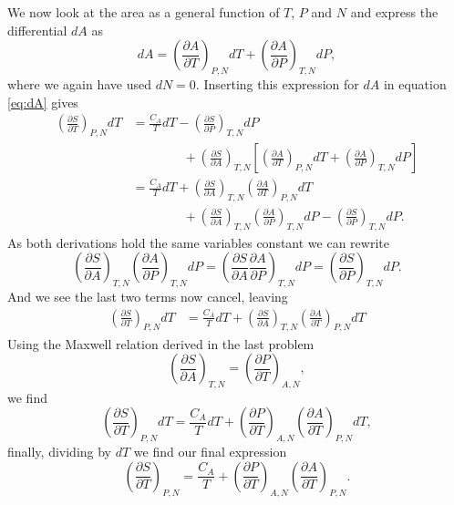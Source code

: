 \documentclass[a4paper, 11pt, titlepage, english]{article}
\begin{document}
We now look at the area as a general function of $T$, $P$ and $N$ and express the differential $dA$ as
$$dA = \left(\frac{\partial A}{\partial T}\right)_{P,N} dT + \left(\frac{\partial A}{\partial P}\right)_{T,N} dP,$$
where we again have used $dN = 0$. Inserting this expression for $dA$ in equation \ref{eq:dA} gives
\begin{align*}
\left( \frac{\partial S}{\partial T}\right)_{P,N}dT &= \frac{C_A}{T}dT -  \left(\frac{\partial S}{\partial P}\right)_{T, N} dP \\ &\qquad\qquad +  \left(\frac{\partial S}{\partial A}\right)_{T, N}\left[\left(\frac{\partial A}{\partial T}\right)_{P,N}dT + \left(\frac{\partial A}{\partial P}\right)_{T,N}dP\right]   \\[0.4cm]
&= \frac{C_A}{T}dT + \left(\frac{\partial S}{\partial A}\right)_{T, N}\left(\frac{\partial A}{\partial T}\right)_{P,N} dT \\ &\qquad\qquad + \left(\frac{\partial S}{\partial A}\right)_{T, N}\left(\frac{\partial A}{\partial P}\right)_{T,N}dP - \left(\frac{\partial S}{\partial P}\right)_{T, N} dP.
\end{align*}
As both derivations hold the same variables constant we can rewrite
$$\left(\frac{\partial S}{\partial A}\right)_{T, N}\left(\frac{\partial A}{\partial P}\right)_{T,N}dP = \left(\frac{\partial S}{\partial A}\frac{\partial A}{\partial P}\right)_{T,N}dP = \left(\frac{\partial S}{\partial P}\right)_{T,N} dP.$$
And we see the last two terms now cancel, leaving
\begin{align*}
\left( \frac{\partial S}{\partial T}\right)_{P,N} dT &=\frac{C_A}{T}dT + \left(\frac{\partial S}{\partial A}\right)_{T, N}\left(\frac{\partial A}{\partial T}\right)_{P,N} dT
\end{align*}
Using the Maxwell relation derived in the last problem
$$\left(\frac{\partial S}{\partial A}\right)_{T,N} = \left(\frac{\partial P}{\partial T}\right)_{A, N},$$
we find
$$ \left( \frac{\partial S}{\partial T}\right)_{P,N}dT = \frac{C_A}{T}dT + \left(\frac{\partial P}{\partial T}\right)_{A, N}\left(\frac{\partial A}{\partial T}\right)_{P,N} dT,$$
finally, dividing by $dT$ we find our final expression
$$ \left( \frac{\partial S}{\partial T}\right)_{P,N} = \frac{C_A}{T} + \left(\frac{\partial P}{\partial T}\right)_{A, N}\left(\frac{\partial A}{\partial T}\right)_{P,N}.$$
\end{document}
